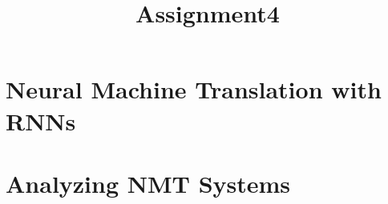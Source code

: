 \documentclass[11pt]{article}
\title{Assignment4}
\begin{document}
\maketitle
\section{Neural Machine Translation with RNNs}
\section{Analyzing NMT Systems}
\end{document}
